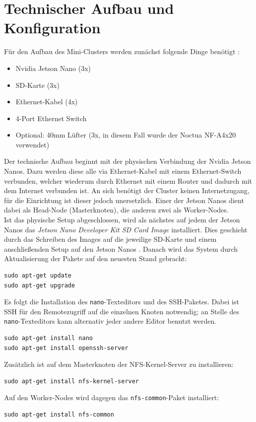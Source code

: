 \documentclass[doktyp=semarbeit, sprache=german]{TUBAFarbeiten}
\begin{document}
\section{Technischer Aufbau und Konfiguration}
Für den Aufbau des Mini-Clusters werden zunächst folgende Dinge benötigt \cite{ClusterSetup}:
\begin{itemize}
	\item Nvidia Jetson Nano (3x)
	\item SD-Karte (3x)
	\item Ethernet-Kabel (4x)
	\item 4-Port Ethernet Switch
	\item Optional: 40mm Lüfter (3x, in diesem Fall wurde der Noctua NF-A4x20 verwendet)
\end{itemize}
Der technische Aufbau beginnt mit der physischen Verbindung der Nvidia Jetson Nanos. Dazu werden diese alle via Ethernet-Kabel mit einem Ethernet-Switch verbunden, welcher wiederum durch Ethernet mit einem Router und dadurch mit dem Internet verbunden ist. An sich benötigt der Cluster keinen Internetzugang, für die Einrichtung ist dieser jedoch unersetzlich. Einer der Jetson Nanos dient dabei als Head-Node (Masterknoten), die anderen zwei als Worker-Nodes.
\\Ist das physische Setup abgeschlossen, wird als nächstes auf jedem der Jetson Nanos das \textit{Jetson Nano Developer Kit SD Card Image} installiert. Dies geschieht durch das Schreiben des Images auf die jeweilige SD-Karte und einem anschließenden Setup auf den Jetson Nanos \cite{SDImage}. Danach wird das System durch Aktualisierung der Pakete auf den neuesten Stand gebracht:
\begin{lstlisting}
sudo apt-get update
sudo apt-get upgrade
\end{lstlisting}
Es folgt die Installation des \texttt{nano}-Texteditors und des SSH-Paketes. Dabei ist SSH für den Remotezugriff auf die einzelnen Knoten notwendig; an Stelle des \texttt{nano}-Texteditors kann alternativ jeder andere Editor benutzt werden.
\begin{lstlisting}
sudo apt-get install nano
sudo apt-get install openssh-server
\end{lstlisting}
Zusätzlich ist auf dem Masterknoten der NFS-Kernel-Server zu installieren:
\begin{lstlisting}
sudo apt-get install nfs-kernel-server
\end{lstlisting}
Auf den Worker-Nodes wird dagegen das \texttt{nfs-common}-Paket installiert:
\begin{lstlisting}
sudo apt-get install nfs-common
\end{lstlisting}
\end{document}
